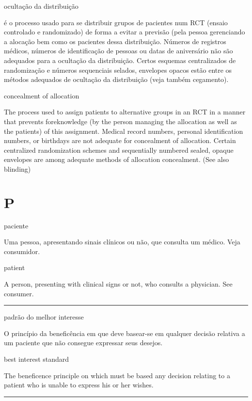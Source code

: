 \documentclass[
]{book}
\begin{document}
ocultação da distribuição

é o processo usado para se distribuir grupos de pacientes num RCT (ensaio controlado e randomizado) de forma a evitar a previsão (pela pessoa gerenciando a alocação bem como os pacientes dessa distribuição. Números de registros médicos, números de identificação de pessoas ou datas de aniversário não são adequados para a ocultação da distribuição. Certos esquemas centralizados de randomização e números sequenciais selados, envelopes opacos estão entre os métodos adequados de ocultação da distribuição (veja também cegamento).

concealment of allocation

The process used to assign patients to alternative groups in an RCT in a manner that prevents foreknowledge (by the person managing the allocation as well as the patients) of this assignment. Medical record numbers, personal identification numbers, or birthdays are not adequate for concealment of allocation. Certain centralized randomization schemes and sequentially numbered sealed, opaque envelopes are among adequate methods of allocation concealment. (See also blinding)

\hypertarget{p}{%
\chapter*{P}\label{p}}

paciente

Uma pessoa, apresentando sinais clínicos ou não, que consulta um médico. Veja consumidor.

patient

A person, presenting with clinical signs or not, who consults a physician. See consumer.

\begin{center}\rule{0.5\linewidth}{0.5pt}\end{center}

padrão do melhor interesse

O princípio da beneficência em que deve basear-se em qualquer decisão relativa a um paciente que não consegue expressar seus desejos.

best interest standard

The beneficence principle on which must be based any decision relating to a patient who is unable to express his or her wishes.

\begin{center}\rule{0.5\linewidth}{0.5pt}\end{center}
\end{document}
